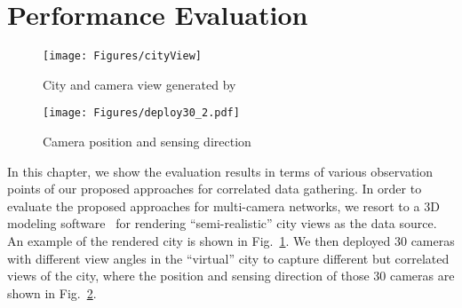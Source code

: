 \section{Performance Evaluation}
\label{sec::evaluation}
%
\begin{figure}
\begin{center}
\texttt{[image: Figures/cityView]}
\caption{\label{fig::cityView}City and camera view generated by~\cite{Suicidator,Blender}}
\end{center}
\end{figure}
%
\begin{figure}
\begin{center}
\texttt{[image: Figures/deploy30\_2.pdf]}
\caption{\label{fig::deploy30}Camera position and sensing direction}
\end{center}
\end{figure}
%
In this chapter, we show the evaluation results in terms of various observation points of our proposed approaches for correlated data gathering.
In order to evaluate the proposed approaches for multi-camera networks, we resort to a 3D modeling software~\cite{Suicidator,Blender} for rendering ``semi-realistic'' city views as the data source.
An example of the rendered city is shown in Fig.~\ref{fig::cityView}.
We then deployed $30$ cameras with different view angles in the ``virtual'' city to capture different but correlated views of the city, where the position and sensing direction of those $30$ cameras are shown in Fig.~\ref{fig::deploy30}.


